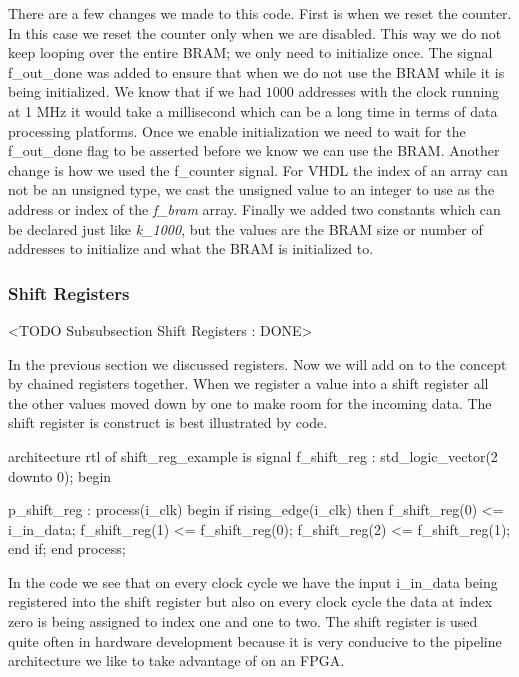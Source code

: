 There are a few changes we made to this code. First is when we reset the counter. In this case we reset the counter only when we are disabled. This way we do not keep looping over the entire \ac{BRAM}; we only need to initialize once. The signal f\_out\_done was added to ensure that when we do not use the \ac{BRAM} while it is being initialized. We know that if we had $1000$ addresses with the clock running at 1 \ac{MHz} it would take a millisecond which can be a long time in terms of data processing platforms. Once we enable initialization we need to wait for the f\_out\_done flag to be asserted before we know we can use the \ac{BRAM}. Another change is how we used the f\_counter signal. For \ac{VHDL} the index of an array can not be an unsigned type, we cast the unsigned value to an integer to use as the address or index of the \emph{f\_bram} array. Finally we added two constants which can be declared just like \emph{k\_1000}, but the values are the \ac{BRAM} size or number of addresses to initialize and what the \ac{BRAM} is initialized to. 


\subsubsection{Shift Registers}
	<TODO Subsubsection  Shift Registers : DONE>

In the previous section we discussed registers. Now we will add on to the concept by chained registers together. When we register a value into a shift register all the other values moved down by one to make room for the incoming data. The shift register is construct is best illustrated by code. 

\begin{VHDLlisting}[tabsize=4]
architecture rtl of shift_reg_example is
	signal f_shift_reg : std_logic_vector(2 downto 0);
begin

p_shift_reg : process(i_clk)
begin
	if rising_edge(i_clk) then
		f_shift_reg(0) <= i_in_data;
		f_shift_reg(1) <= f_shift_reg(0);
		f_shift_reg(2) <= f_shift_reg(1);
	end if;
end process;
\end{VHDLlisting}

In the code we see that on every clock cycle we have the input i\_in\_data being registered into the shift register but also on every clock cycle the data at index zero is being assigned to index one and one to two. The shift register is used quite often in hardware development because it is very conducive to the pipeline architecture we like to take advantage of on an \ac{FPGA}.

